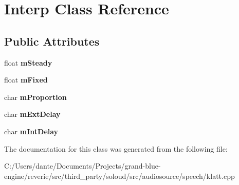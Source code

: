 \hypertarget{class_interp}{}\section{Interp Class Reference}
\label{class_interp}
\subsection*{Public Attributes}
\begin{DoxyCompactItemize}
\item 
\mbox{\label{class_interp_a4884af4598e05edd8024697480380e0b}} 
float {\bfseries m\+Steady}
\item 
\mbox{\label{class_interp_aafff58c60037ce2feae4ff47f22140dc}} 
float {\bfseries m\+Fixed}
\item 
\mbox{\label{class_interp_a5f08d5ba1321558d3a3ade53cdddad0b}} 
char {\bfseries m\+Proportion}
\item 
\mbox{\label{class_interp_a4613988dfd2c2c639df5460a4c694c4b}} 
char {\bfseries m\+Ext\+Delay}
\item 
\mbox{\label{class_interp_a260dcb54cd47708aeeb0193c018545b9}} 
char {\bfseries m\+Int\+Delay}
\end{DoxyCompactItemize}


The documentation for this class was generated from the following file\+:\begin{DoxyCompactItemize}
\item 
C\+:/\+Users/dante/\+Documents/\+Projects/grand-\/blue-\/engine/reverie/src/third\+\_\+party/soloud/src/audiosource/speech/klatt.\+cpp\end{DoxyCompactItemize}
